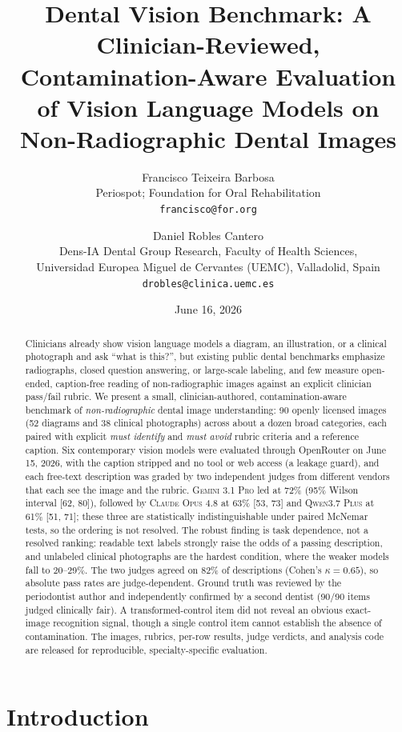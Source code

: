 \documentclass[11pt]{article}
\title{Dental Vision Benchmark: A Clinician-Reviewed, Contamination-Aware Evaluation of Vision Language Models on Non-Radiographic Dental Images}
\author{
Francisco Teixeira Barbosa\\
Periospot; Foundation for Oral Rehabilitation\\
\texttt{francisco@for.org}
\and
Daniel Robles Cantero\\
Dens-IA Dental Group Research, Faculty of Health Sciences,\\
Universidad Europea Miguel de Cervantes (UEMC), Valladolid, Spain\\
\texttt{drobles@clinica.uemc.es}
}
\date{June 16, 2026}
\newcommand{\model}[1]{\textsc{#1}}
\begin{document}
\maketitle

\begin{abstract}
Clinicians already show vision language models a diagram, an illustration, or a clinical photograph and ask ``what is this?'', but existing public dental benchmarks emphasize radiographs, closed question answering, or large-scale labeling, and few measure open-ended, caption-free reading of non-radiographic images against an explicit clinician pass/fail rubric.
We present a small, clinician-authored, contamination-aware benchmark of \emph{non-radiographic} dental image understanding: 90 openly licensed images (52 diagrams and 38 clinical photographs) across about a dozen broad categories, each paired with explicit \emph{must identify} and \emph{must avoid} rubric criteria and a reference caption.
Six contemporary vision models were evaluated through OpenRouter on June 15, 2026, with the caption stripped and no tool or web access (a leakage guard), and each free-text description was graded by two independent judges from different vendors that each see the image and the rubric.
\model{Gemini 3.1 Pro} led at 72\% (95\% Wilson interval [62, 80]), followed by \model{Claude Opus 4.8} at 63\% [53, 73] and \model{Qwen3.7 Plus} at 61\% [51, 71]; these three are statistically indistinguishable under paired McNemar tests, so the ordering is not resolved.
The robust finding is task dependence, not a resolved ranking: readable text labels strongly raise the odds of a passing description, and unlabeled clinical photographs are the hardest condition, where the weaker models fall to 20--29\%.
The two judges agreed on 82\% of descriptions (Cohen's $\kappa=0.65$), so absolute pass rates are judge-dependent.
Ground truth was reviewed by the periodontist author and independently confirmed by a second dentist (90/90 items judged clinically fair).
A transformed-control item did not reveal an obvious exact-image recognition signal, though a single control item cannot establish the absence of contamination.
The images, rubrics, per-row results, judge verdicts, and analysis code are released for reproducible, specialty-specific evaluation.
\end{abstract}

\section{Introduction}
\end{document}

